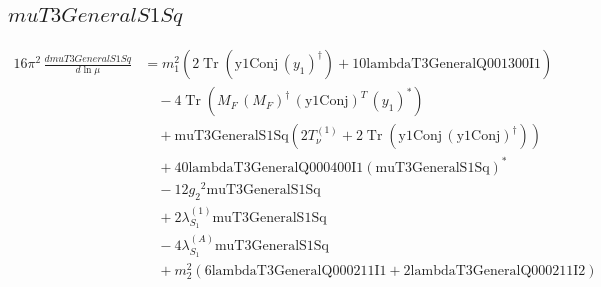 \documentclass[10pt,a4paper]{article}
\begin{document}
\subsection*{$muT3GeneralS1Sq$}
\begin{align*}
16\pi^2\,\frac{d muT3GeneralS1Sq}{d\ln\mu} &={m_1^2} (2 \operatorname{Tr}\!\left(\text{y1Conj}\,\left({y_1}\right)^{\dagger}\right)+10 \text{lambdaT3GeneralQ001300I1}) \\
&\quad -4 \operatorname{Tr}\!\left({M_F}\,\left({M_F}\right)^{\dagger}\,\left(\text{y1Conj}\right)^{T}\,\left({y_1}\right)^{*}\right) \\
&\quad +\text{muT3GeneralS1Sq} (2 T_{\nu}^{(1)}+2 \operatorname{Tr}\!\left(\text{y1Conj}\,\left(\text{y1Conj}\right)^{\dagger}\right)) \\
&\quad +40 \text{lambdaT3GeneralQ000400I1} \left(\text{muT3GeneralS1Sq}\right)^{*} \\
&\quad -12 {g_2}^2 \text{muT3GeneralS1Sq} \\
&\quad +2 {\lambda_{S_1}^{(1)}} \text{muT3GeneralS1Sq} \\
&\quad -4 {\lambda_{S_1}^{(A)}} \text{muT3GeneralS1Sq} \\
&\quad +{m_2^2} (6 \text{lambdaT3GeneralQ000211I1}+2 \text{lambdaT3GeneralQ000211I2}) \\
\end{align*}
\end{document}
